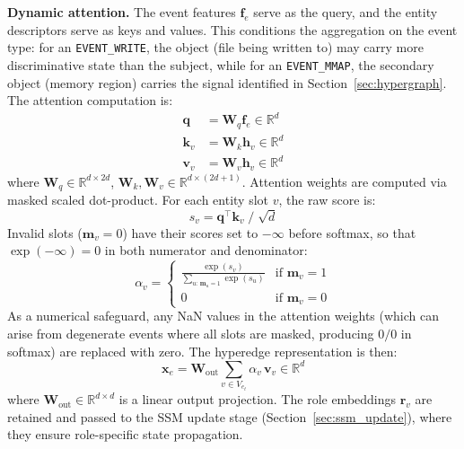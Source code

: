 \documentclass[letterpaper,twocolumn,10pt]{article}
\begin{document}
\textbf{Dynamic attention.} The event features $\mathbf{f}_e$ serve as the query, and the entity descriptors serve as keys and values. This conditions the aggregation on the event type: for an \texttt{EVENT\_WRITE}, the object (file being written to) may carry more discriminative state than the subject, while for an \texttt{EVENT\_MMAP}, the secondary object (memory region) carries the signal identified in Section~\ref{sec:hypergraph}. The attention computation is:
\begin{align}
    \mathbf{q} &= \mathbf{W}_q \mathbf{f}_e \in \mathbb{R}^{d} \label{eq:agg_q} \\
    \mathbf{k}_v &= \mathbf{W}_k \mathbf{h}_v \in \mathbb{R}^{d} \label{eq:agg_k} \\
    \mathbf{v}_v &= \mathbf{W}_v \mathbf{h}_v \in \mathbb{R}^{d} \label{eq:agg_v}
\end{align}
where $\mathbf{W}_q \in \mathbb{R}^{d \times 2d}$, $\mathbf{W}_k, \mathbf{W}_v \in \mathbb{R}^{d \times (2d+1)}$. Attention weights are computed via masked scaled dot-product. For each entity slot $v$, the raw score is:
\begin{equation}
    s_v = \mathbf{q}^\top \mathbf{k}_v \;/\; \sqrt{d}
    \label{eq:raw_score}
\end{equation}
Invalid slots ($\mathbf{m}_v = 0$) have their scores set to $-\infty$ before softmax, so that $\exp(-\infty) = 0$ in both numerator and denominator:
\begin{equation}
    \alpha_v = 
    \begin{cases}
        \displaystyle\frac{\exp(s_v)}{\sum_{u:\,\mathbf{m}_u = 1} \exp(s_u)} & \text{if } \mathbf{m}_v = 1 \\[6pt]
        0 & \text{if } \mathbf{m}_v = 0
    \end{cases}
    \label{eq:attn_weights}
\end{equation}
As a numerical safeguard, any NaN values in the attention weights (which can arise from degenerate events where all slots are masked, producing $0/0$ in softmax) are replaced with zero. The hyperedge representation is then:
\begin{equation}
    \mathbf{x}_e = \mathbf{W}_{\text{out}} \sum_{v \in V_{e_t}} \alpha_v \, \mathbf{v}_v \in \mathbb{R}^d
    \label{eq:x_e}
\end{equation}
where $\mathbf{W}_{\text{out}} \in \mathbb{R}^{d \times d}$ is a linear output projection. The role embeddings $\mathbf{r}_v$ are retained and passed to the SSM update stage (Section~\ref{sec:ssm_update}), where they ensure role-specific state propagation.
\end{document}

